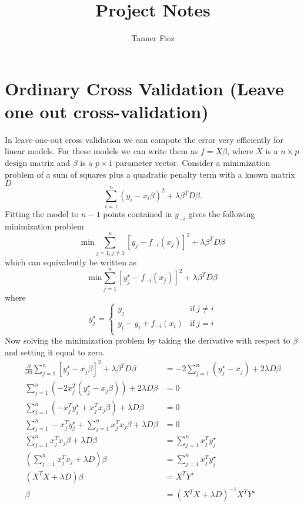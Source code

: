 \documentclass{article}
\begin{document}
\title{Project Notes}
\author{Tanner Fiez}
\date{}
\maketitle

\section{Ordinary Cross Validation (Leave one out cross-validation)}
In leave-one-out cross validation we can compute the error very efficiently for linear models. For these models we can write them as $f = X\beta$, where $X$ is a $n \times p$ design matrix and $\beta$ is a $p \times 1$ parameter vector. Consider a minimization problem of a sum of squares plus a quadratic penalty term with a known matrix $D$
\begin{equation}
\sum_{i=1}^n (y_i - x_i \beta)^2 + \lambda \beta^TD\beta.
\end{equation}
Fitting the model to $n-1$ points contained in $y_{-i}$ gives the following minimization problem
\begin{equation}
\text{}{\text{min}} \sum_{j=1,j\neq1}^n [y_j - f_{-i}(x_j)]^2 + \lambda \beta^TD\beta
\end{equation}
which can equivalently be written as 
\begin{equation}
\text{}{\text{min}} \sum_{j=1}^n [y_j^\star - f_{-i}(x_j)]^2 + \lambda \beta^TD\beta
\end{equation}
where 
\begin{equation}
y_j^\star = 
\begin{cases}
y_j & \text{if} \ j \neq i \\
y_i - y_i + f_{-i}(x_i) & \text{if} \ j = i \\
\end{cases}
\end{equation}
Now solving the minimization problem by taking the derivative with respect to $\beta$ and setting it equal to zero.
\begin{equation}
\begin{split}
\frac{\partial}{\partial \beta} \sum_{j=1}^n [y_j^\star - x_j\beta]^2 + \lambda \beta^TD\beta &=  -2 \sum_{j=1}^n (y_j^\star - x_j) + 2\lambda D \beta \\
\sum_{j=1}^n (-2 x_j^T(y_j^\star - x_j\beta)) + 2\lambda D\beta &= 0 \\
\sum_{j=1}^n (-x_j^Ty_j^\star + x_j^Tx_j\beta) + \lambda D\beta &= 0 \\
\sum_{j=1}^n -x_j^Ty_j^\star + \sum_{j=1}^n x_j^Tx_j\beta + \lambda D\beta &= 0 \\
\sum_{j=1}^n x_j^Tx_j\beta + \lambda D\beta &= \sum_{j=1}^n x_j^Ty_j^\star  \\
(\sum_{j=1}^n x_j^Tx_j + \lambda D)\beta &= \sum_{j=1}^n x_j^Ty_j^\star  \\
(X^TX + \lambda D)\beta &= X^TY^\star  \\
\beta &= (X^TX + \lambda D)^{-1}X^TY^\star  \\
\end{split}
\end{equation}
\end{document}
